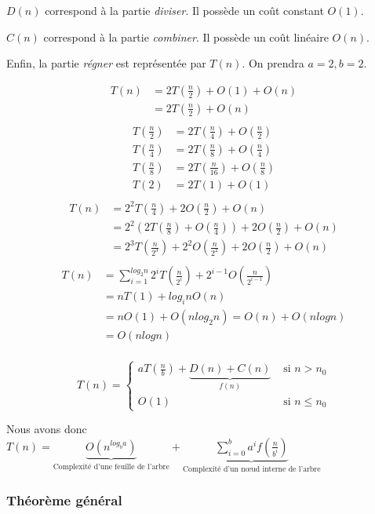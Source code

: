 $D(n)$ correspond à la partie \textit{diviser}. Il possède un coût constant
$O(1)$.

$C(n)$ correspond à la partie \textit{combiner}. Il possède un coût linéaire
$O(n)$.

Enfin, la partie \textit{régner} est représentée par $T(n)$. On prendra
$a=2, b=2$.

\begin{align*}
T(n) &= 2T(\frac{n}{2}) + O(1) + O(n)\\
     &= 2T(\frac{n}{2}) + O(n)\\
\end{align*}
\begin{align*}
T(\frac{n}{2}) &= 2T(\frac{n}{4}) + O(\frac{n}{2})\\
T(\frac{n}{4}) &= 2T(\frac{n}{8}) + O(\frac{n}{4})\\
T(\frac{n}{8}) &= 2T(\frac{n}{16}) + O(\frac{n}{8})\\
T(2) &= 2T(1) + O(1)\\
\end{align*}
\begin{align*}
T(n) &= 2^2T(\frac{n}{4}) + 2O(\frac{n}{2}) + O(n)\\
     &= 2^2(2T(\frac{n}{8}) + O(\frac{n}{4})) + 2O(\frac{n}{2}) + O(n)\\
     &= 2^3T(\frac{n}{2^3}) + 2^2O(\frac{n}{2^2}) + 2O(\frac{n}{2}) + O(n)\\
\end{align*}
\begin{align*}
T(n) &= \displaystyle{\sum^{log_2n}_{i=1}}2^iT(\frac{n}{2^i}) +
2^{i-1}O(\frac{n}{2^{i-1}})\\
     &= nT(1) + log_inO(n)\\
     &= nO(1) + O(nlog_2n) = O(n) + O(nlogn)\\
     &= O(nlogn)\\
\end{align*}

$$T(n) = \left\{\begin{array}{ll}
aT(\frac{n}{b}) + \underbrace{D(n) + C(n)}_{f(n)} & \mbox{ si $n > n_0$}\\
O(1) & \mbox{ si $n \le n_0$}
\end{array}\right.$$

Nous avons donc $T(n) = \underbrace{O(n^{log_ba})}_{\text{Complexité d'une
feuille de l'arbre}} + \underbrace{\displaystyle{\sum^{b}_{i=0}}a^if(
\frac{n}{b^i})}_{\text{Complexité d'un nœud interne de l'arbre}}$

\subsubsection{Théorème général}


